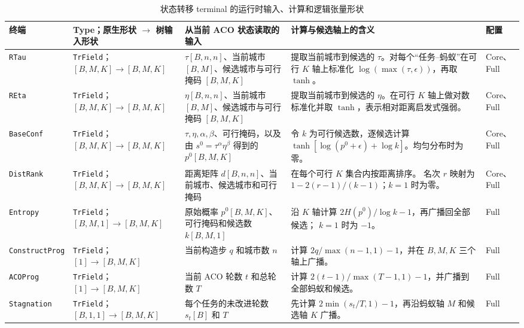 \documentclass[letterpaper,journal]{IEEEtran}
\begin{document}
\begin{table}[t]
\caption{状态转移 terminal 的运行时输入、计算和逻辑张量形状}
\label{tab:transition-terminals-zh}
\centering
\scriptsize
\renewcommand{\arraystretch}{1.18}
\setlength{\tabcolsep}{2.5pt}
\begin{tabular}{L{19mm}L{28mm}L{49mm}L{62mm}L{14mm}}
\toprule
终端 & Type；原生形状 \(\to\) 树输入形状 &
从当前 ACO 状态读取的输入 & 计算与候选轴上的含义 & 配置\\
\midrule
\texttt{RTau} &
\texttt{TrField}；\([B,M,K]\to[B,M,K]\) &
\(\tau[B,n,n]\)、当前城市 \([B,M]\)、候选城市与可行掩码 \([B,M,K]\) &
提取当前城市到候选的 \(\tau\)。对每个“任务--蚂蚁”在可行 \(K\) 轴上标准化
\(\log(\max(\tau,\epsilon))\)，再取 \(\tanh\)。 &
Core、Full\\
\texttt{REta} &
\texttt{TrField}；\([B,M,K]\to[B,M,K]\) &
\(\eta[B,n,n]\)、当前城市 \([B,M]\)、候选城市与可行掩码 \([B,M,K]\) &
提取当前城市到候选的 \(\eta\)。在可行 \(K\) 轴上做对数标准化并取
\(\tanh\)，表示相对距离启发式强弱。 &
Core、Full\\
\texttt{BaseConf} &
\texttt{TrField}；\([B,M,K]\to[B,M,K]\) &
\(\tau,\eta,\alpha,\beta\)、可行掩码，以及由
\(s^0=\tau^\alpha\eta^\beta\) 得到的 \(p^0[B,M,K]\) &
令 \(k\) 为可行候选数，逐候选计算
\(\tanh[\log(p^0+\epsilon)+\log k]\)。均匀分布时为零。 &
Core、Full\\
\texttt{DistRank} &
\texttt{TrField}；\([B,M,K]\to[B,M,K]\) &
距离矩阵 \(d[B,n,n]\)、当前城市、候选城市和可行掩码 &
在每个可行 \(K\) 集合内按距离排序。
名次 \(r\) 映射为 \(1-2(r-1)/(k-1)\)；\(k=1\) 时为零。 &
Core、Full\\
\texttt{Entropy} &
\texttt{TrField}；\([B,M,1]\to[B,M,K]\) &
原始概率 \(p^0[B,M,K]\)、可行掩码和候选数 \(k[B,M,1]\) &
沿 \(K\) 轴计算 \(2H(p^0)/\log k-1\)，再广播回全部候选；
\(k=1\) 时为 \(-1\)。 &
Full\\
\texttt{ConstructProg} &
\texttt{TrField}；\([1]\to[B,M,K]\) &
当前构造步 \(q\) 和城市数 \(n\) &
计算 \(2q/\max(n-1,1)-1\)，并在 \(B,M,K\) 三个轴上广播。 &
Full\\
\texttt{ACOProg} &
\texttt{TrField}；\([1]\to[B,M,K]\) &
当前 ACO 轮数 \(t\) 和总轮数 \(T\) &
计算 \(2(t-1)/\max(T-1,1)-1\)，并广播到全部蚂蚁和候选。 &
Full\\
\texttt{Stagnation} &
\texttt{TrField}；\([B,1,1]\to[B,M,K]\) &
每个任务的未改进轮数 \(s_t[B]\) 和 \(T\) &
先计算 \(2\min(s_t/T,1)-1\)，再沿蚂蚁轴 \(M\) 和候选轴 \(K\) 广播。 &
Full\\
\bottomrule
\end{tabular}
\end{table}
\end{document}
